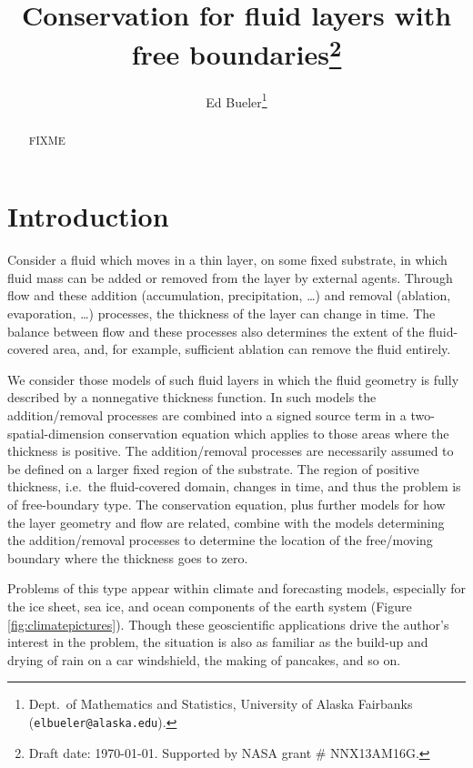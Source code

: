 \documentclass[final,leqno,onefignum,onetabnum]{siamltex1213bueler}
\title{Conservation for fluid layers with free boundaries\thanks{Draft date: \today.  Supported by NASA grant \# NNX13AM16G.}}
\author{Ed Bueler\thanks{Dept.~of Mathematics and Statistics, University of Alaska Fairbanks (\texttt{elbueler@alaska.edu}).}}
\begin{document}
\maketitle
{}

\begin{abstract}
FIXME
\end{abstract}


\pagestyle{myheadings}
\thispagestyle{plain}


\section{Introduction}  \label{sec:intro}

Consider a fluid which moves in a thin layer, on some fixed substrate, in which fluid mass can be added or removed from the layer by external agents.  Through flow and these addition (accumulation, precipitation, \dots) and removal (ablation, evaporation, \dots) processes, the thickness of the layer can change in time.  The balance between flow and these processes also determines the extent of the fluid-covered area, and, for example, sufficient ablation can remove the fluid entirely.

We consider those models of such fluid layers in which the fluid geometry is fully described by a nonnegative thickness function.  In such models the addition/removal processes are combined into a signed source term in a two-spatial-dimension conservation equation which applies to those areas where the thickness is positive.  The addition/removal processes are necessarily assumed to be defined on a larger fixed region of the substrate.  The region of positive thickness, i.e.~the fluid-covered domain, changes in time, and thus the problem is of free-boundary type.  The conservation equation, plus further models for how the layer geometry and flow are related, combine with the models determining the addition/removal processes to determine the location of the free/moving boundary where the thickness goes to zero.

Problems of this type appear within climate and forecasting models, especially for the ice sheet, sea ice, and ocean components of the earth system (Figure \ref{fig:climatepictures}).  Though these geoscientific applications drive the author's interest in the problem, the situation is also as familiar as the build-up and drying of rain on a car windshield, the making of pancakes, and so on.
\end{document}
